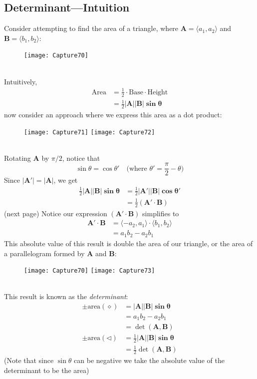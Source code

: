 \documentclass{report}
\begin{document}
\subsection{Determinant---Intuition} %
Consider attempting to find the area of a triangle, where $\mathbf{A}=\langle a_1,a_2\rangle$ and $\mathbf{B}=\langle b_1,b_2\rangle$:
\begin{figure}[h]
\texttt{[image: Capture70]}\\
\centering
\end{figure}\\
Intuitively,
\begin{align*}
\text{Area}&=\frac{1}{2}\cdot\text{Base}\cdot\text{Height}\\
&=\frac{1}{2}\mathbf{|A||B|\sin\theta}
\end{align*}
now consider an approach where we express this area as a dot product:
\begin{figure}[h]
\texttt{[image: Capture71]}
\texttt{[image: Capture72]}\\
\centering
\end{figure}\\
Rotating $\mathbf{A}$ by $\pi/2$, notice that
\begin{equation*}
\sin\theta=\cos\theta'\quad\text{(where $\theta'=\frac{\pi}{2}-\theta$)}
\end{equation*}
Since $\mathbf{|A'|=|A|}$, we get
\begin{align*}
\frac{1}{2}\mathbf{|A||B|\sin\theta}&=\frac{1}{2}\mathbf{|A'||B|\cos\theta'}\\
&=\frac{1}{2}(\mathbf{A'\cdot B})
\end{align*}
(next page)
\newpage
\noindent Notice our expression $(\mathbf{A'\cdot B})$ simplifies to
\begin{align*}
\mathbf{A'\cdot B}
&=\langle -a_2,a_1\rangle\cdot\langle b_1,b_2\rangle\\
&=a_1b_2-a_2b_1
\end{align*}
This absolute value of this result is double the area of our triangle, or the 
area of a parallelogram formed by $\mathbf{A}$ and $\mathbf{B}$:
\begin{figure}[h]
\texttt{[image: Capture70]}
\texttt{[image: Capture73]}\\
\centering
\end{figure}\\
This result is known as the \textit{determinant}:
\begin{align*}
\pm\text{area}(\diamond)&=\mathbf{|A||B|\sin\theta}\\
&=a_1b_2-a_2b_1\\
&=\det(\mathbf{A,B})\\
\pm\text{area}(\triangleleft)&=\frac{1}{2}\mathbf{|A||B|\sin\theta}\\
&=\frac{1}{2}\det(\mathbf{A,B})
\end{align*}
(Note that since $\sin\theta$ can be negative we take the absolute value of the
determinant to be the area)
\newpage
\end{document}

